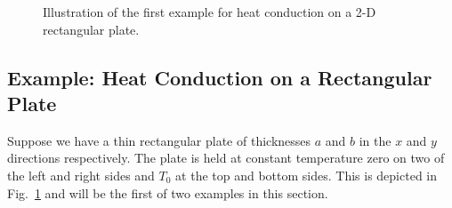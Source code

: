 \begin{figure}[tb!]
\begin{center}
\caption{Illustration of the first example for heat conduction on a 2-D rectangular plate.}
\label{Fig:pde_illustration2DRectangularPlate1}
\end{center}
\end{figure}

\subsection{Example: Heat Conduction on a Rectangular Plate}

Suppose we have a thin rectangular plate of thicknesses $a$ and $b$ in the $x$ and $y$ directions respectively. The plate is held at constant temperature zero on two of the left and right sides and $T_0$ at the top and bottom sides. This is depicted in Fig.~\ref{Fig:pde_illustration2DRectangularPlate1} and will be the first of two examples in this section.

